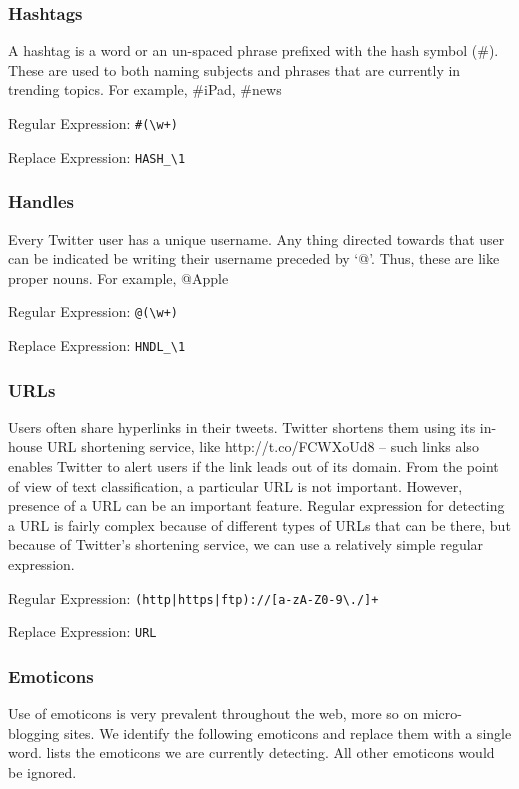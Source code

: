 \subsubsection{Hashtags} A hashtag is a word or an un-spaced phrase prefixed
with the hash symbol (\#). These are used to both naming subjects and phrases
that are currently in trending topics. For example, {\#}iPad, {\#}news

Regular Expression: \verb'#(\w+)'

Replace Expression: \verb'HASH_\1'

\subsubsection{Handles} Every Twitter user has a unique username. Any thing
directed towards that user can be indicated be writing their username preceded
by ‘@’. Thus, these are like proper nouns. For example, @Apple

Regular Expression: \verb'@(\w+)'

Replace Expression: \verb'HNDL_\1'

\subsubsection{URLs} Users often share hyperlinks in their tweets. Twitter
shortens them using its in-house URL shortening service, like
http://t.co/FCWXoUd8 -- such links also enables Twitter to alert users if the
link leads out of its domain. From the point of view of text classification, a
particular URL is not important. However, presence of a URL can be an important
feature. Regular expression for detecting a URL is fairly complex because of
different types of URLs that can be there, but because of Twitter’s shortening
service, we can use a relatively simple regular expression.

Regular Expression: \verb'(http|https|ftp)://[a-zA-Z0-9\./]+'

Replace Expression: \verb'URL'

\subsubsection{Emoticons} Use of emoticons is very prevalent throughout the web,
more so on micro-blogging sites. We identify the following emoticons and replace
them with a single word.  lists the emoticons we are currently
detecting. All other emoticons would be ignored.

